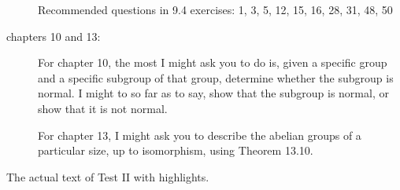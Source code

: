 \documentclass[12pt]{article}
\begin{document}
\begin{description}
Recommended questions in 9.4 exercises:  1, 3, 5, 12, 15, 16, 28, 31, 48, 50

\item[chapters 10 and 13:]

For chapter 10, the most I might ask you to do is, given a specific group and a specific subgroup of that group, determine
whether the subgroup is normal.  I might to so far as to say, show that the subgroup is normal, or show that it is not normal.

For chapter 13, I might ask you to describe the abelian groups of a particular size, up to isomorphism, using Theorem 13.10.


\end{description}

The actual text of Test II  with highlights.
\end{document}
